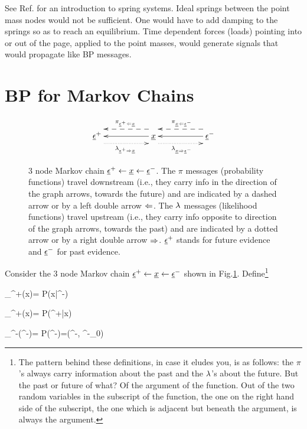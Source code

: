 See Ref.\cite{wiki-spring-net}
for an introduction to spring systems.
Ideal springs between the point mass
nodes would
not be sufficient.
One would have to add damping to
the springs so as
to reach an equilibrium. 
Time dependent forces (loads)
pointing into or out of the page, applied
to the point masses, would
generate signals that would
propagate 
like BP messages.



\section{BP for Markov Chains}
\begin{figure}[h!]
$$\xymatrix{
\rveps^+
\ar@{<--}@<2ex>[rr]^{\pi_{\rveps^+\ldart\rvx}}
\ar@{.>}@<-2ex>[rr]_{\lam_{\rveps^+\rdart\rvx}}
&&
\rvx\ar[ll]
\ar@{<--}@<2ex>[rr]^{\pi_{\rvx\ldart\rveps^-}}
\ar@{.>}@<-2ex>[rr]_{\lam_{\rvx\rdart\rveps^-}}
&&
\rveps^-\ar[ll]
}$$
\caption{3 node Markov chain
$\underline{\epsilon}^+\leftarrow{\underline{x}}\leftarrow \underline{\epsilon}^-$.
The $\pi$  messages
(probability functions)
travel downstream (i.e., 
they carry info
in the direction
of the graph arrows, towards the future)
and are indicated by a dashed arrow
or by a left double arrow $\Leftarrow$. 
The $\lambda$  messages 
(likelihood functions) travel 
upstream (i.e., they 
carry info opposite to 
direction of the graph arrows,
towards the past)
and are indicated
by a dotted arrow
or by a right double arrow $\Rightarrow$.
$\underline{\epsilon}^+$
stands for future evidence and 
$\underline{\epsilon}^-$ for past evidence. 
}
\label{fig-mp-3chain}
\end{figure}

Consider the 
3 node Markov chain
$\underline{\epsilon}^+\leftarrow{\underline{x}}\leftarrow \underline{\epsilon}^-$
shown in 
Fig.\ref{fig-mp-3chain}.
Define\footnote{The pattern
behind these definitions,
in case it eludes you, 
is as follows: the $\pi$'s
always carry information
about the past
and the $\lambda$'s 
about the future.
But the past or future of 
what? Of the argument
of the function.
Out  of the
two random variables
in the subscript
of the function,
the one on the 
right hand side
of the subscript, 
the  one which
is adjacent but beneath 
 the argument, is always the 
argument.}


\beq
\pi_{\rveps^+\ldart \rvx}(x)=
P(x|\eps^-)
\eeq

\beq 
\lam_{\rveps^+\rdart \rvx}(x)=
P(\eps^+|x)
\eeq

\beq
\pi_{\rvx\ldart \rveps^-}(\eps^-)=
P(\eps^-)=\delta(\eps^-, \eps^-_0)
\eeq

